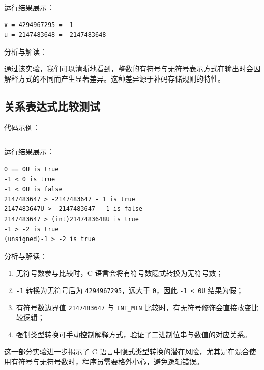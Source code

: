 \documentclass[12pt, a4paper]{academics}
\begin{document}
运行结果展示：

\begin{verbatim}
x = 4294967295 = -1
u = 2147483648 = -2147483648
\end{verbatim}

分析与解读：

通过该实验，我们可以清晰地看到，整数的有符号与无符号表示方式在输出时会因解释方式的不同而产生显著差异。这种差异源于补码存储规则的特性。

\subsection{关系表达式比较测试}

代码示例：

\inputminted{c}{../src/relational.c}

运行结果展示：

\begin{verbatim}
0 == 0U is true
-1 < 0 is true
-1 < 0U is false
2147483647 > -2147483647 - 1 is true
2147483647U > -2147483647 - 1 is false
2147483647 > (int)2147483648U is true
-1 > -2 is true
(unsigned)-1 > -2 is true
\end{verbatim}

分析与解读：

\begin{enumerate}
    \item 无符号数参与比较时，C 语言会将有符号数隐式转换为无符号数；
    \item \texttt{-1} 转换为无符号后为 \texttt{4294967295}，远大于 \texttt{0}，因此 \texttt{-1 < 0U} 结果为假；
    \item 有符号数边界值 \texttt{2147483647} 与 \texttt{INT_MIN} 比较时，有无符号修饰会直接改变比较逻辑；
    \item 强制类型转换可手动控制解释方式，验证了二进制位串与数值的对应关系。
\end{enumerate}

这一部分实验进一步揭示了 C 语言中隐式类型转换的潜在风险，尤其是在混合使用有符号与无符号数时，程序员需要格外小心，避免逻辑错误。
\end{document}
